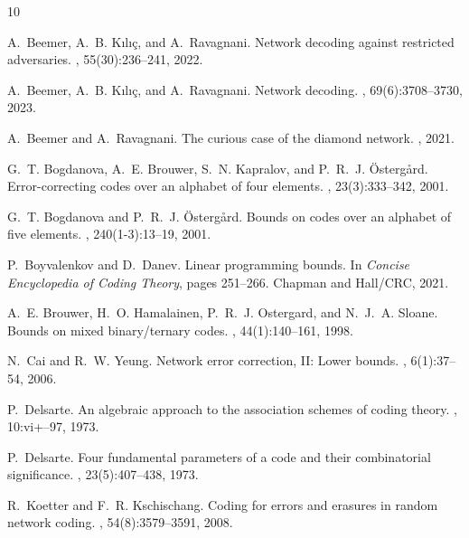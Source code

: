 \documentclass[11pt]{article}
\begin{document}
\begin{thebibliography}{10}

A.~Beemer, A.~B. K{\i}l{\i}{\c{c}}, and A.~Ravagnani.
\newblock Network decoding against restricted adversaries.
, 55(30):236--241, 2022.

A.~Beemer, A.~B. K{\i}l{\i}{\c{c}}, and A.~Ravagnani.
\newblock Network decoding.
, 69(6):3708--3730,
  2023.

A.~Beemer and A.~Ravagnani.
\newblock The curious case of the diamond network.
, 2021.

G.~T. Bogdanova, A.~E. Brouwer, S.~N. Kapralov, and P.~R.~J. {\"O}sterg{\aa}rd.
\newblock Error-correcting codes over an alphabet of four elements.
, 23(3):333--342, 2001.

G.~T. Bogdanova and P.~R.~J. {\"O}sterg{\aa}rd.
\newblock Bounds on codes over an alphabet of five elements.
, 240(1-3):13--19, 2001.

P.~Boyvalenkov and D.~Danev.
\newblock Linear programming bounds.
\newblock In {\em Concise Encyclopedia of Coding Theory}, pages 251--266.
  Chapman and Hall/CRC, 2021.

A.~E. Brouwer, H.~O. Hamalainen, P.~R.~J. Ostergard, and N.~J.~A. Sloane.
\newblock Bounds on mixed binary/ternary codes.
, 44(1):140--161, 1998.

N.~Cai and R.~W. Yeung.
\newblock Network error correction, {I}{I}: {L}ower bounds.
, 6(1):37--54, 2006.

P.~Delsarte.
\newblock An algebraic approach to the association schemes of coding theory.
, 10:vi+--97, 1973.

P.~Delsarte.
\newblock Four fundamental parameters of a code and their combinatorial
  significance.
, 23(5):407--438, 1973.

R.~Koetter and F.~R. Kschischang.
\newblock Coding for errors and erasures in random network coding.
, 54(8):3579--3591,
  2008.


\end{thebibliography}
\end{document}
